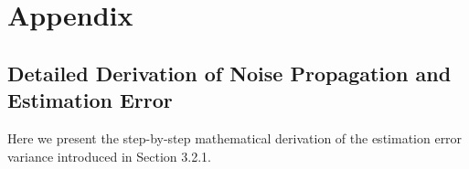 \documentclass{article}
\theoremstyle{plain}
\theoremstyle{definition}
\begin{document}
\clearpage



\clearpage
\appendix
\section{Appendix}

\subsection{Detailed Derivation of Noise Propagation and Estimation Error}
Here we present the step-by-step mathematical derivation of the estimation error variance introduced in Section 3.2.1.
\end{document}
